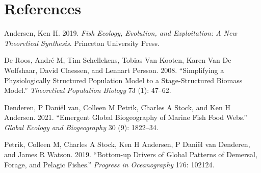 \documentclass[
]{article}
\newlength{\cslhangindent}
\newenvironment{CSLReferences}[2] %
 {\begin{list}{}{%
  \setlength{\itemindent}{0pt}
  \setlength{\leftmargin}{0pt}
  \setlength{\parsep}{0pt}
  \ifodd #1
   \setlength{\leftmargin}{\cslhangindent}
   \setlength{\itemindent}{-1\cslhangindent}
  \fi
  \setlength{\itemsep}{#2\baselineskip}}}
 {\end{list}}
\begin{document}
\newpage

\section{References}\label{references}



\protect{}\label{refs}
\begin{CSLReferences}{1}{1}
Andersen, Ken H. 2019. \emph{Fish Ecology, Evolution, and Exploitation:
A New Theoretical Synthesis}. Princeton University Press.

De Roos, André M, Tim Schellekens, Tobias Van Kooten, Karen Van De
Wolfshaar, David Claessen, and Lennart Persson. 2008. {``Simplifying a
Physiologically Structured Population Model to a Stage-Structured
Biomass Model.''} \emph{Theoretical Population Biology} 73 (1): 47--62.

Denderen, P Daniël van, Colleen M Petrik, Charles A Stock, and Ken H
Andersen. 2021. {``Emergent Global Biogeography of Marine Fish Food
Webs.''} \emph{Global Ecology and Biogeography} 30 (9): 1822--34.

Petrik, Colleen M, Charles A Stock, Ken H Andersen, P Daniël van
Denderen, and James R Watson. 2019. {``Bottom-up Drivers of Global
Patterns of Demersal, Forage, and Pelagic Fishes.''} \emph{Progress in
Oceanography} 176: 102124.

\end{CSLReferences}
\end{document}
